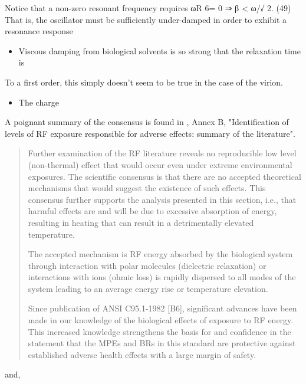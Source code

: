 \documentclass[paper.tex]{subfiles}
\begin{document}
Notice that a non-zero resonant frequency
requires
ωR 6= 0 ⇒ β < ω/√
2. (49)
That is, the oscillator must be sufficiently under-damped in order to exhibit a
resonance response 

\begin{itemize}
		\item Viscous damping from biological solvents is so strong that the relaxation time is 
\end{itemize}

To a first order, this simply doesn't seem to be true in the case of the virion.

\begin{itemize}
		\item The charge 
\end{itemize}








A poignant summary of the consensus is found in \cite{IEEE2006}, Annex B, "Identification of levels of RF exposure responsible for adverse effects: summary of the literature".

\begin{quote}
	Further examination of the RF literature reveals no reproducible low level (non-thermal) effect that would
	occur even under extreme environmental exposures. The scientific consensus is that there are no accepted
	theoretical mechanisms that would suggest the existence of such effects. This consensus further supports the
	analysis presented in this section, i.e., that harmful effects are and will be due to excessive absorption of
	energy, resulting in heating that can result in a detrimentally elevated temperature. 
	
	The accepted mechanism is RF energy absorbed by the biological system through interaction with polar molecules (dielectric relaxation) or interactions with ions (ohmic loss) is rapidly dispersed to all modes of the system leading to an average energy rise or temperature elevation. 
	
	Since publication of ANSI C95.1-1982 [B6], significant advances have been made in our knowledge of the biological effects of exposure to RF energy. This increased knowledge strengthens the basis for and confidence in the statement that the MPEs and BRs in this	standard are protective against established adverse health effects with a large margin of safety.
\end{quote}

and, 
\end{document}
